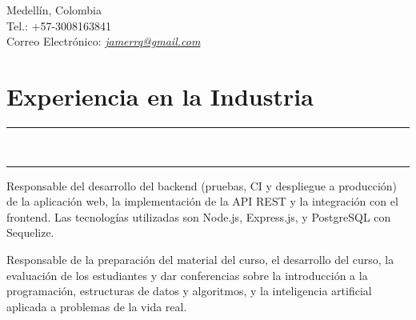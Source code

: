 \documentclass[]{rahulworld-resume}
\begin{document}
\hfill
\begin{minipage}[t]{0.66\textwidth}
    \hspace*{0pt}\hfill    \\
    \hspace*{0pt}\hfill    \\
    \hspace*{0pt}\hfill Medellín, Colombia\\
    \hspace*{0pt}\hfill Tel.: +57-3008163841 \\
    \hspace*{0pt}\hfill Correo Electrónico:
    \textit{\href{mailto:janerrq@gmail.com}{jamerrq@gmail.com}}
    \section{Experiencia en la Industria}
    \noindent\rule{12.5cm}{0.4pt} \\
    \noindent\rule{12.5cm}{0.4pt}

    \noindent
    \hspace{5em}%
    \begin{minipage}{0.85\textwidth\vspace{2pt}} Responsable del desarrollo
        del backend (pruebas, CI y despliegue a producción) de la aplicación web, la implementación de la API REST y la
        integración con el frontend. Las tecnologías utilizadas son Node.js, Express.js,
        y PostgreSQL con Sequelize.
    \end{minipage}

    \noindent
    \hspace{5em}%
    \begin{minipage}{0.85\textwidth\vspace{2pt}} Responsable de la preparación del
        material del curso, el desarrollo del curso, la evaluación de los
        estudiantes y dar conferencias sobre la introducción a la programación, estructuras de
        datos y algoritmos, y la inteligencia artificial aplicada a problemas de la vida real.


\end{minipage}
\end{minipage}
\end{document}

